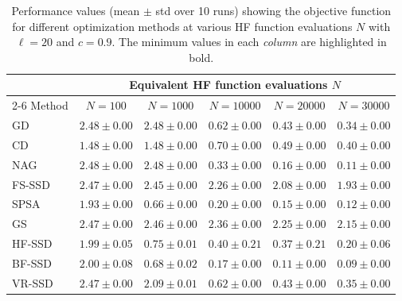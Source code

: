 \documentclass[10pt]{article} %
\numberwithin{equation}{section}
\theoremstyle{plain}
\theoremstyle{definition}
\newcommand{\<}{\langle}
\renewcommand{\>}{\rangle}
\renewcommand{\(}{\left(}
\renewcommand{\)}{\right)}
\renewcommand{\[}{\left[}
\renewcommand{\]}{\right]}
\begin{document}
\begin{table}[ht]
    \centering
    \begin{tabular}{lccccc}
        \toprule
        & \multicolumn{5}{c}{Equivalent HF function evaluations $N$} \\
        \cmidrule(l){2-6}
        Method & $N=100$ & $N=1000$ & $N=10000$ & $N=20000$ & $N=30000$ \\ 
        \midrule
        GD & $2.48 \pm 0.00$ & $2.48 \pm 0.00$ & $0.62 \pm 0.00$ & $0.43 \pm 0.00$ & $0.34 \pm 0.00$ \\
        CD & $\mathbf{1.48 \pm 0.00}$ & $1.48 \pm 0.00$ & $0.70 \pm 0.00$ & $0.49 \pm 0.00$ & $0.40 \pm 0.00$ \\
        NAG & $2.48 \pm 0.00$ & $2.48 \pm 0.00$ & $0.33 \pm 0.00$ & $0.16 \pm 0.00$ & $0.11 \pm 0.00$ \\
        FS-SSD & $2.47 \pm 0.00$ & $2.45 \pm 0.00$ & $2.26 \pm 0.00$ & $2.08 \pm 0.00$ & $1.93 \pm 0.00$ \\
        SPSA & $1.93 \pm 0.00$ & $\mathbf{0.66 \pm 0.00}$ & $0.20 \pm 0.00$ & $0.15 \pm 0.00$ & $0.12 \pm 0.00$ \\
        GS & $2.47 \pm 0.00$ & $2.46 \pm 0.00$ & $2.36 \pm 0.00$ & $2.25 \pm 0.00$ & $2.15 \pm 0.00$ \\
        HF-SSD & $1.99 \pm 0.05$ & $0.75 \pm 0.01$ & $0.40 \pm 0.21$ & $0.37 \pm 0.21$ & $0.20 \pm 0.06$ \\
        BF-SSD & $2.00 \pm 0.08$ & $0.68 \pm 0.02$ & $\mathbf{0.17 \pm 0.00}$ & $\mathbf{0.11 \pm 0.00}$ & $\mathbf{0.09 \pm 0.00}$ \\
        VR-SSD & $2.47 \pm 0.00$ & $2.09 \pm 0.01$ & $0.62 \pm 0.00$ & $0.43 \pm 0.00$ & $0.35 \pm 0.00$ \\
        \bottomrule
    \end{tabular}
    \caption{Performance values (mean $\pm$ std over 10 runs) showing the objective function for different optimization methods at various HF function evaluations $N$ with $\ell=20$ and $c=0.9$. The minimum values in each \emph{column} are highlighted in bold.}
    \label{tab:worst_performance_table1}
\end{table}
\end{document}

